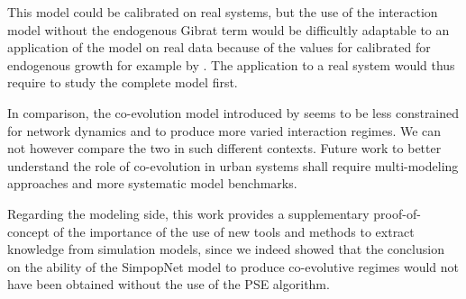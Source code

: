 \documentclass[graybox]{svmult}
\begin{document}


This model could be calibrated on real systems, but the use of the interaction model without the endogenous Gibrat term would be difficultly adaptable to an application of the model on real data because of the values for calibrated for endogenous growth for example by \cite{raimbault2018indirect}. The application to a real system would thus require to study the complete model first.



In comparison, the co-evolution model introduced by \cite{2018arXiv180409430R} seems to be less constrained for network dynamics and to produce more varied interaction regimes. We can not however compare the two in such different contexts. Future work to better understand the role of co-evolution in urban systems shall require multi-modeling approaches \cite{cottineau2015modular} and more systematic model benchmarks.



Regarding the modeling side, this work provides a supplementary proof-of-concept of the importance of the use of new tools and methods to extract knowledge from simulation models, since we indeed showed that the conclusion on the ability of the SimpopNet model to produce co-evolutive regimes would not have been obtained without the use of the PSE algorithm.
\end{document}
